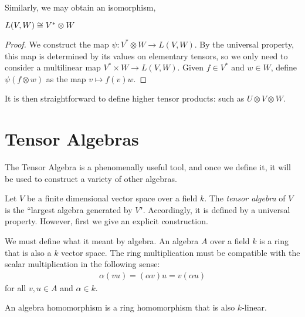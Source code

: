 \documentclass{owmaths}
\begin{document}
Similarly, we may obtain an isomorphism,
\begin{proposition}
    $L(V,W) \cong V^* \otimes W$
\end{proposition}
\begin{proof}
    We construct the map $\psi: V^* \otimes W \rightarrow L(V,W)$. By the universal
    property, this map is determined by its values on elementary tensors,
    so we only need to consider a multilinear map $V^*\times W \rightarrow L(V,W)$.
    Given $f \in V^*$ and $w \in W$, define $\psi(f\otimes w)$ as the map
    $v\mapsto f(v)w$.
\end{proof} 

It is then straightforward to define higher tensor products: such as $U \otimes V \otimes W$.


\section{Tensor Algebras}
The Tensor Algebra is a phenomenally useful tool, and once we define it, it
will be used to construct a variety of other algebras.

Let $V$ be a finite dimensional vector space over a field $k$. The
\emph{tensor algebra} of $V$ is the ``largest algebra generated by $V$".
Accordingly, it is defined by a universal property. However, first we
give an explicit construction.

We must define what it meant by algebra. An algebra $A$ over a field
$k$ is a ring that is also a $k$ vector space. The ring multiplication
must be compatible with the scalar multiplication in the following sense: 
\begin{align*}
    \alpha(vu) = (\alpha v)u = v(\alpha u)
\end{align*}
for all $v,u \in A$ and $\alpha \in k$. 

An algebra homomorphism is a ring homomorphism that is also $k$-linear.
\end{document}
